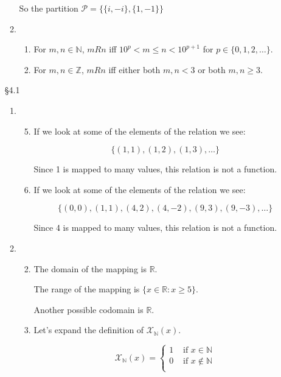 \documentclass[12pt,letterpaper]{article}
\begin{document}
\begin{enumerate}
\begin{enumerate}
          So the partition $\mathscr{P} = \{\{i, -i\}, \{1, -1\}\}$
        \setcounter{enumii}{5}
        \item
          \begin{enumerate}
            \item
              For $m, n \in \mathbb{N}$, $m R n$ iff $10^p < m \leq n < 10^{p + 1}$ for $p \in \{0, 1, 2, \dots\}$.
            \setcounter{enumiii}{4}
            \item
              For $m, n \in \mathbb{Z}$, $m R n$ iff either both $m, n < 3$ or both $m, n \geq 3$.
          \end{enumerate}
      \end{enumerate}
    \item [\S 4.1]
      \begin{enumerate}
        \item
          \begin{enumerate}
            \setcounter{enumiii}{4}
            \item
              If we look at some of the elements of the relation we see:

              \[\{(1, 1), (1, 2), (1, 3), \dots\}\]

              Since 1 is mapped to many values, this relation is not a function.
            \item
              If we look at some of the elements of the relation we see:

              \[\{(0, 0), (1, 1), (4, 2), (4, -2), (9, 3), (9, -3), \dots\}\]

              Since 4 is mapped to many values, this relation is not a function.
          \end{enumerate}
        \setcounter{enumii}{2}
        \item
          \begin{enumerate}
            \setcounter{enumiii}{1}
            \item
              The domain of the mapping is $\mathbb{R}$.

              The range of the mapping is $\{x \in \mathbb{R} : x \geq 5\}$.

              Another possible codomain is $\mathbb{R}$.
            \setcounter{enumiii}{4}
            \item
              Let's expand the definition of $\mathcal{X}_\mathbb{N}(x)$.

              \[
                \mathcal{X}_\mathbb{N}(x)
                =
                \begin{cases}
                  1 & \text{ if } x \in \mathbb{N} \\
                  0 & \text{ if } x \notin \mathbb{N} \\
                \end{cases}
              \]


\end{enumerate}
\end{enumerate}
\end{enumerate}
\end{document}
